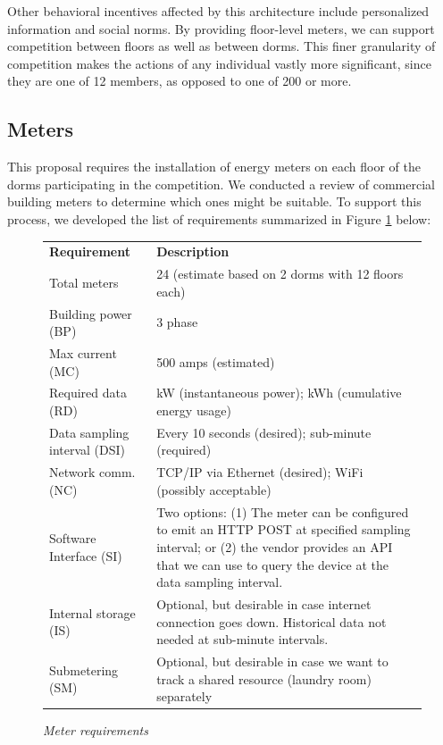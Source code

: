 \documentclass[11pt]{article}
\begin{document}
Other behavioral incentives affected by this architecture include
personalized information and social norms.  By providing floor-level
meters, we can support competition between floors as well as between dorms.
This finer granularity of competition makes the actions of any individual
vastly more significant, since they are one of 12 members, as opposed to
one of 200 or more.

\subsection{Meters}
\label{sec:meters}

This proposal requires the installation of energy meters on each floor of
the dorms participating in the competition.  We conducted a review of
commercial building meters to determine which ones might be
suitable.  To support this process, we developed the list of
requirements summarized in Figure \ref{fig:meterrequirements} below:

\begin{figure}[!ht]
\small
\begin{tabular}{p{1.75in}p{4.25in}} \hline
{\bf Requirement} & {\bf Description}  \\
Total meters & 24 (estimate based on 2 dorms with 12 floors each) \\ 

Building power (BP) & 3 phase \\  

Max current (MC) & 500 amps (estimated)  \\ 

Required data (RD) & kW (instantaneous power); kWh (cumulative energy usage) \\ 

Data sampling interval (DSI) & Every 10 seconds (desired); sub-minute (required) \\ 

Network comm. (NC) & TCP/IP via Ethernet (desired); WiFi (possibly acceptable) \\ 

Software Interface (SI) & Two options: (1) The meter can be configured to emit
an HTTP POST at specified sampling interval; or (2) the vendor provides an
API that we can use to query the device at the data sampling interval. \\ 

Internal storage (IS) & Optional, but desirable in case internet connection
goes down. Historical data not needed at sub-minute intervals. \\ 

Submetering (SM) & Optional, but desirable in case we want to track a shared
resource (laundry room) separately \\ \hline

\end{tabular} 
\normalsize
\caption{{\em Meter requirements}}
\label{fig:meterrequirements}
\end{figure}
\end{document}
